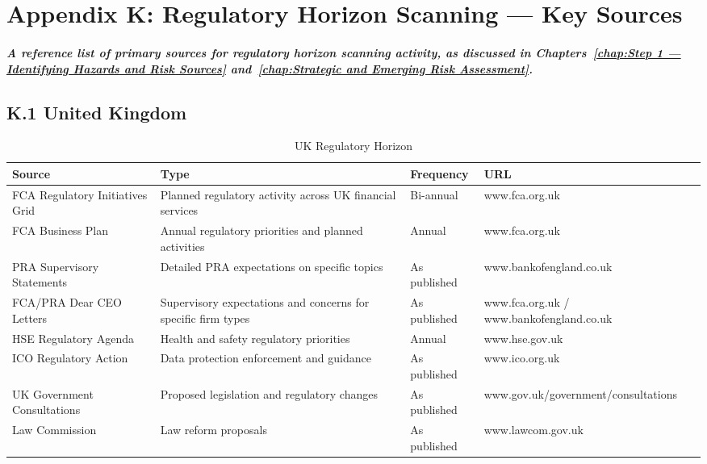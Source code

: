 \chapter*{Appendix K: Regulatory Horizon Scanning — Key Sources}
\label{chap:Appendix K: Regulatory Horizon Scanning — Key Sources}

\paragraph{A reference list of primary sources for regulatory horizon scanning activity, as discussed in Chapters~\ref{chap:Step 1 — Identifying Hazards and Risk Sources} and~\ref{chap:Strategic and Emerging Risk Assessment}.}

\section*{K.1 United Kingdom}

\begin{table}[H]
  \centering
  \renewcommand{\arraystretch}{1.5}
  \begin{tabularx}{\textwidth}{ | >{\raggedright\arraybackslash}p{} 
								| >{\raggedright\arraybackslash}p{} 
								| >{\raggedright\arraybackslash}p{} 
                                | >{\raggedright\arraybackslash}X | }
    \hline
    \textbf{Source} & \textbf{Type} & \textbf{Frequency} & \textbf{URL}  \\
    \hline
    FCA Regulatory Initiatives Grid & Planned regulatory activity across UK financial services & Bi-annual & www.fca.org.uk\\
    \hline
    FCA Business Plan & Annual regulatory priorities and planned activities & Annual & www.fca.org.uk\\
    \hline
    PRA Supervisory Statements & Detailed PRA expectations on specific topics & As published & www.bankofengland.co.uk\\
    \hline
    FCA/PRA Dear CEO Letters & Supervisory expectations and concerns for specific firm types & As published & www.fca.org.uk / www.bankofengland.co.uk\\
    \hline
    HSE Regulatory Agenda & Health and safety regulatory priorities & Annual & www.hse.gov.uk\\
    \hline
    ICO Regulatory Action & Data protection enforcement and guidance & As published & www.ico.org.uk\\
    \hline
    UK Government Consultations & Proposed legislation and regulatory changes & As published & www.gov.uk/government/consultations\\
    \hline
    Law Commission & Law reform proposals & As published & www.lawcom.gov.uk\\
    \hline
  \end{tabularx}
  \caption{UK Regulatory Horizon}
\end{table}


